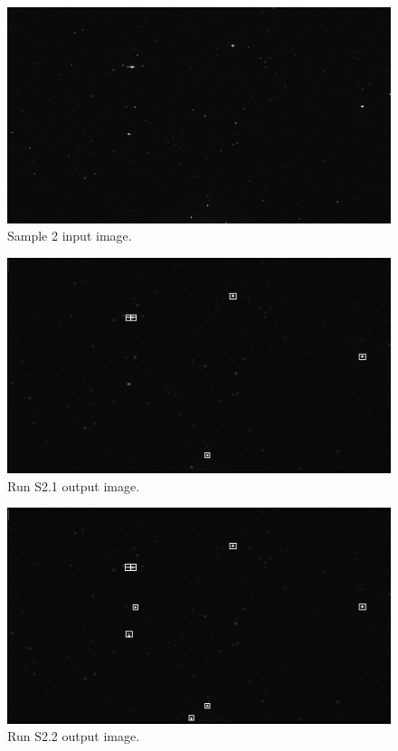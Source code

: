 \documentclass[12pt]{report}
\begin{document}
\begin{figure}[h]
    \centering
    \includegraphics[scale=1.2]{results/s1_in.png}
    \caption{Sample 2 input image.}
    \label{res:s1_in}
\end{figure}
\begin{figure}[h]
    \centering
    \includegraphics[scale=1.2]{results/s1_1.png}
    \caption{Run S2.1 output image.}
    \label{res:s1_1}
\end{figure}
\begin{figure}[h]
    \centering
    \includegraphics[scale=1.2]{results/s1_2.png}
    \caption{Run S2.2 output image.}
    \label{res:s1_2}
\end{figure}
\end{document}
